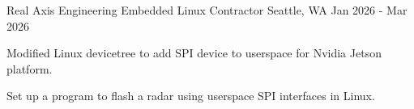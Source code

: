   \begin{cventry}
    {Real Axis Engineering} %
    {Embedded Linux Contractor} %
    {Seattle, WA} %
    {Jan 2026 - Mar 2026} %
    {
    \begin{cvitems}
      \item{
      Modified Linux devicetree to add SPI device to userspace for Nvidia Jetson platform.
      }
      \item{
      Set up a program to flash a radar using userspace SPI interfaces in Linux.
      }
    \end{cvitems}
    }
  \end{cventry}
